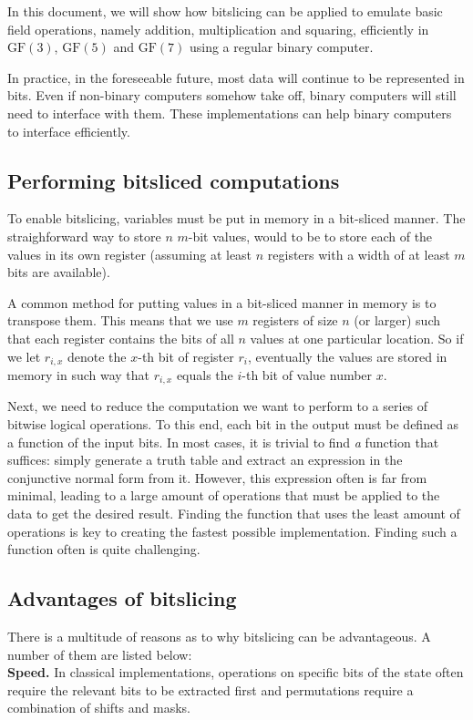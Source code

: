 \documentclass{report}
\newcommand{\GF}{\text{GF}}
\begin{document}
In this document, we will show how bitslicing can be applied to emulate basic field operations, namely addition, multiplication and squaring, efficiently in $\GF(3)$, $\GF(5)$ and $\GF(7)$ using a regular binary computer.

In practice, in the foreseeable future, most data will continue to be represented in bits. Even if non-binary computers somehow take off, binary computers will still need to interface with them. These implementations can help binary computers to interface efficiently.

\subsection{Performing bitsliced computations}
To enable bitslicing, variables must be put in memory in a bit-sliced manner.
The straighforward way to store $n$ $m$-bit values, would to be to store each of the values in its own register (assuming at least $n$ registers with a width of at least $m$ bits are available).

A common method for putting values in a bit-sliced manner in memory is to transpose them. This means that we use $m$ registers of size $n$ (or larger) such that each register contains the bits of all $n$ values at one particular location. So if we let $r_{i,x}$ denote the $x$-th bit of register $r_i$, eventually the values are stored in memory in such way that $r_{i,x}$ equals the $i$-th bit of value number $x$.

Next, we need to reduce the computation we want to perform to a series of bitwise logical operations.
To this end, each bit in the output must be defined as a function of the input bits.
In most cases, it is trivial to find \emph{a} function that suffices: simply generate a truth table and extract an expression in the conjunctive normal form from it. 
However, this expression often is far from minimal, leading to a large amount of operations that must be applied to the data to get the desired result. Finding the function that uses the least amount of operations is key to creating the fastest possible implementation. Finding such a function often is quite challenging.

\subsection{Advantages of bitslicing}
There is a multitude of reasons as to why bitslicing can be advantageous.\cite{tabert2018bitslicing} A number of them are listed below:\\
\noindent\textbf{Speed.} In classical implementations, operations on specific bits of the state often require the relevant bits to be extracted first and permutations require a combination of shifts and masks.
\end{document}
